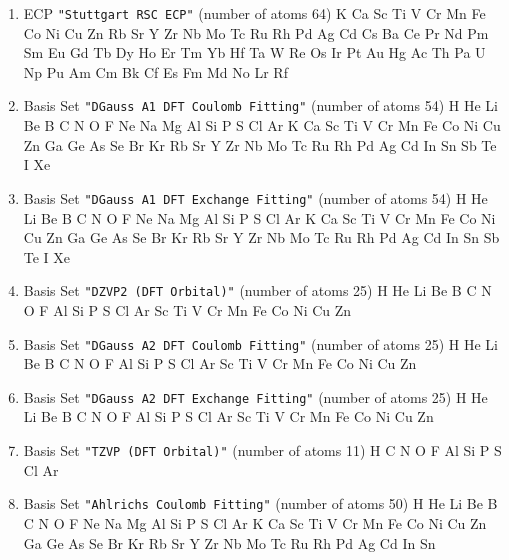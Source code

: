 \begin{enumerate}
\item ECP \verb#"Stuttgart RSC ECP"# (number of atoms 64) \newline
  K Ca Sc Ti V Cr Mn Fe Co Ni Cu Zn Rb Sr Y Zr Nb Mo Tc Ru Rh Pd Ag Cd Cs
 Ba Ce Pr Nd Pm Sm Eu Gd Tb Dy Ho Er Tm Yb Hf Ta W Re Os Ir Pt Au Hg Ac Th
 Pa U Np Pu Am Cm Bk Cf Es Fm Md No Lr Rf


\item Basis Set \verb#"DGauss A1 DFT Coulomb Fitting"# (number of atoms 54) \newline
  H He Li Be B C N O F Ne Na Mg Al Si P S Cl Ar K Ca Sc Ti V Cr Mn
 Fe Co Ni Cu Zn Ga Ge As Se Br Kr Rb Sr Y Zr Nb Mo Tc Ru Rh Pd Ag Cd In Sn
 Sb Te I Xe


\item Basis Set \verb#"DGauss A1 DFT Exchange Fitting"# (number of atoms 54) \newline
  H He Li Be B C N O F Ne Na Mg Al Si P S Cl Ar K Ca Sc Ti V Cr Mn
 Fe Co Ni Cu Zn Ga Ge As Se Br Kr Rb Sr Y Zr Nb Mo Tc Ru Rh Pd Ag Cd In Sn
 Sb Te I Xe


\item Basis Set \verb#"DZVP2 (DFT Orbital)"# (number of atoms 25) \newline
  H He Li Be B C N O F Al Si P S Cl Ar Sc Ti V Cr Mn Fe Co Ni Cu Zn



\item Basis Set \verb#"DGauss A2 DFT Coulomb Fitting"# (number of atoms 25) \newline
  H He Li Be B C N O F Al Si P S Cl Ar Sc Ti V Cr Mn Fe Co Ni Cu Zn



\item Basis Set \verb#"DGauss A2 DFT Exchange Fitting"# (number of atoms 25) \newline
  H He Li Be B C N O F Al Si P S Cl Ar Sc Ti V Cr Mn Fe Co Ni Cu Zn



\item Basis Set \verb#"TZVP (DFT Orbital)"# (number of atoms 11) \newline
  H C N O F Al Si P S Cl Ar


\item Basis Set \verb#"Ahlrichs Coulomb Fitting"# (number of atoms 50) \newline
  H He Li Be B C N O F Ne Na Mg Al Si P S Cl Ar K Ca Sc Ti V Cr Mn
 Fe Co Ni Cu Zn Ga Ge As Se Br Kr Rb Sr Y Zr Nb Mo Tc Ru Rh Pd Ag Cd In Sn




\end{enumerate}
